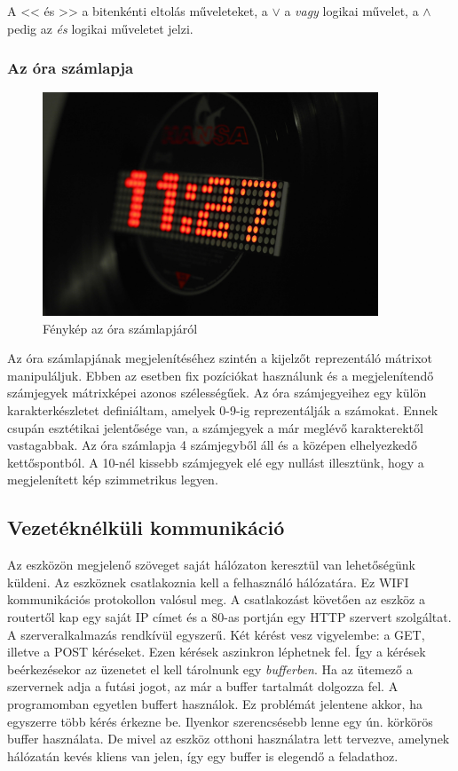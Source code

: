 \documentclass[a4paper, 12pt]{article}
\begin{document}
\bigskip

\bigskip
A << és >> a bitenkénti eltolás műveleteket, a $\lor$ a \textit{vagy} logikai művelet, a $\land$ pedig az \textit{és} logikai műveletet jelzi.

\newpage

\subsubsection{Az óra számlapja}

\begin{figure}[ht]
	\centering
	\includegraphics[width = 10cm]{images/clockface.JPG}
	\caption{Fénykép az óra számlapjáról}
	\label{fig:clockface}
\end{figure}	

Az óra számlapjának megjelenítéséhez szintén a kijelzőt reprezentáló mátrixot manipuláljuk.
Ebben az esetben fix pozíciókat használunk és a megjelenítendő számjegyek mátrixképei azonos szélességűek.
Az óra számjegyeihez egy külön karakterkészletet definiáltam, amelyek 0-9-ig reprezentálják a számokat. Ennek csupán esztétikai jelentősége van, a számjegyek a már meglévő karakterektől vastagabbak.
Az óra számlapja 4 számjegyből áll és a középen elhelyezkedő kettőspontból.
A 10-nél kissebb számjegyek elé egy nullást illesztünk, hogy a megjelenített kép szimmetrikus legyen.

\subsection{Vezetéknélküli kommunikáció}
Az eszközön megjelenő szöveget saját hálózaton keresztül van lehetőségünk küldeni. Az eszköznek csatlakoznia kell a felhasználó hálózatára. Ez WIFI kommunikációs protokollon valósul meg. A csatlakozást követően az eszköz a routertől kap egy saját IP címet és a 80-as portján egy HTTP szervert szolgáltat.
A szerveralkalmazás rendkívül egyszerű. Két kérést vesz vigyelembe: a GET, illetve a POST kéréseket.
Ezen kérések aszinkron léphetnek fel. Így a kérések beérkezésekor az üzenetet el kell tárolnunk egy \textit{bufferben}. Ha az ütemező a szervernek adja a futási jogot, az már a buffer tartalmát dolgozza fel.
A programomban egyetlen buffert használok. Ez problémát jelentene akkor, ha egyszerre több kérés érkezne be. Ilyenkor szerencsésebb lenne egy ún. körkörös buffer használata. De mivel az eszköz otthoni használatra lett tervezve, amelynek hálózatán kevés kliens van jelen, így egy buffer is elegendő a feladathoz.
\end{document}
